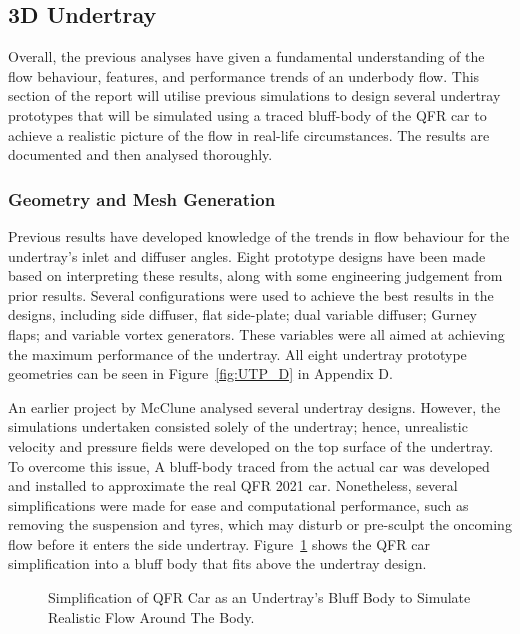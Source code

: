 \subsection{3D Undertray}
Overall, the previous analyses have given a fundamental understanding of the flow behaviour, features, and performance trends of an underbody flow. This section of the report will utilise previous simulations to design several undertray prototypes that will be simulated using a traced bluff-body of the QFR car to achieve a realistic picture of the flow in real-life circumstances. The results are documented and then analysed thoroughly.

\subsubsection{Geometry and Mesh Generation}
\noindent Previous results have developed knowledge of the trends in flow behaviour for the undertray's inlet and diffuser angles. Eight prototype designs have been made based on interpreting these results, along with some engineering judgement from prior results. Several configurations were used to achieve the best results in the designs, including side diffuser, flat side-plate; dual variable diffuser; Gurney flaps; and variable vortex generators. These variables were all aimed at achieving the maximum performance of the undertray. All eight undertray prototype geometries can be seen in Figure~\ref{fig:UTP_D} in Appendix D.

\noindent An earlier project by McClune \cite{McClune2018DesignCar} analysed several undertray designs. However, the simulations undertaken consisted solely of the undertray; hence, unrealistic velocity and pressure fields were developed on the top surface of the undertray. To overcome this issue, A bluff-body traced from the actual car was developed and installed to approximate the real QFR 2021 car. Nonetheless, several simplifications were made for ease and computational performance, such as removing the suspension and tyres, which may disturb or pre-sculpt the oncoming flow before it enters the side undertray. Figure~\ref{fig:3D_UT_BB_SIMPLIFICATION} shows the QFR car simplification into a bluff body that fits above the undertray design.

\begin{figure}[!htb] 
    \centering
    \noindent{}
    \caption{Simplification of QFR Car as an Undertray's Bluff Body to Simulate Realistic Flow Around The Body.}
      \label{fig:3D_UT_BB_SIMPLIFICATION}
\end{figure}

